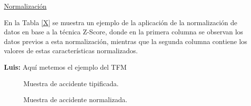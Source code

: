 \documentclass{uathesis-es}
\begin{document}
\underline{Normalización}

En la Tabla \ref{X} se muestra un ejemplo de la aplicación de la normalización de datos en base a la técnica Z-Score, donde en la primera columna se observan los datos previos a esta normalización, mientras que la segunda columna contiene los valores de estas características normalizados.

\textbf{Luis: } Aquí metemos el ejemplo del TFM


\begin{figure}[H]
	\scriptsize
	\centering
	\renewcommand{\arraystretch}{1.4}
	
	\captionsetup{singlelinecheck = false, format= hang, justification=raggedright, font=footnotesize, labelsep=space}
	
	\begin{c}{.4\textwidth}
		\centering
		
		\captionsetup{singlelinecheck = false, format= hang, justification=centering, font=footnotesize, labelsep=space}
		
		\caption{Muestra de accidente tipificada.}
		\label{ProcesoMatriz:MuestraTipificada}
	\end{c}
	\hspace{20mm}
	\renewcommand{\arraystretch}{1.4}
	\begin{subtable}{.4\textwidth}
		\hspace{5mm}
		\caption{Muestra de accidente normalizada.}
		\label{ProcesoMatriz:MuestraNormalizada}
	\end{subtable}
\end{figure}%
\end{document}

